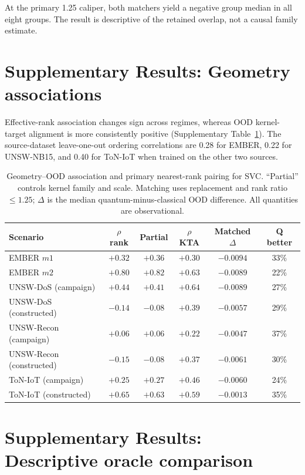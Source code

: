 \documentclass[11pt]{article}
\begin{document}
At the primary 1.25 caliper, both matchers yield a negative group median in
all eight groups. The result is descriptive of the retained overlap, not a
causal family estimate.

\section*{Supplementary Results: Geometry associations}
\label{supp:geometry}

Effective-rank association changes sign across regimes, whereas OOD
kernel-target alignment is more consistently positive
(Supplementary Table~\ref{supp:tab_geometry}). The source-dataset leave-one-out ordering
correlations are 0.28 for EMBER, 0.22 for UNSW-NB15, and 0.40 for ToN-IoT
when trained on the other two sources.

\begin{table}[ht]
\centering
\caption{Geometry--OOD association and primary nearest-rank pairing for SVC.
``Partial'' controls kernel family and scale. Matching uses replacement and
rank ratio $\leq1.25$; $\Delta$ is the median quantum-minus-classical OOD
difference. All quantities are observational.}
\label{supp:tab_geometry}
\small
\setlength{\tabcolsep}{4pt}
\begin{tabular}{lccccc}
\toprule
Scenario & $\rho$ rank & Partial & $\rho$ KTA & Matched $\Delta$ & Q better \\
\midrule
EMBER $m1$ & $+0.32$ & $+0.36$ & $+0.30$ & $-0.0094$ & 33\% \\
EMBER $m2$ & $+0.80$ & $+0.82$ & $+0.63$ & $-0.0089$ & 22\% \\
UNSW-DoS (campaign) & $+0.44$ & $+0.41$ & $+0.64$ & $-0.0089$ & 27\% \\
UNSW-DoS (constructed) & $-0.14$ & $-0.08$ & $+0.39$ & $-0.0057$ & 29\% \\
UNSW-Recon (campaign) & $+0.06$ & $+0.06$ & $+0.22$ & $-0.0047$ & 37\% \\
UNSW-Recon (constructed) & $-0.15$ & $-0.08$ & $+0.37$ & $-0.0061$ & 30\% \\
ToN-IoT (campaign) & $+0.25$ & $+0.27$ & $+0.46$ & $-0.0060$ & 24\% \\
ToN-IoT (constructed) & $+0.65$ & $+0.63$ & $+0.59$ & $-0.0013$ & 35\% \\
\bottomrule
\end{tabular}
\end{table}

\section*{Supplementary Results: Descriptive oracle comparison}
\label{supp:oracle}
\end{document}
